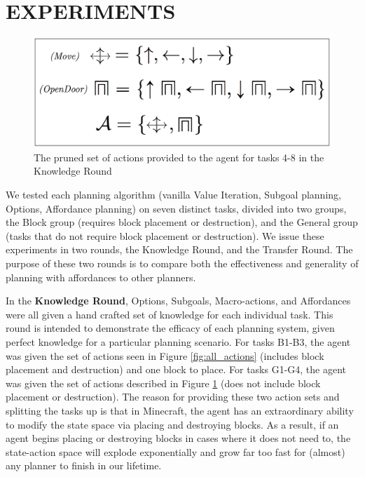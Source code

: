 \documentclass[]{article}
\begin{document}
\section{EXPERIMENTS}

\begin{figure}
\centering
\includegraphics[scale=0.2]{figures/reg_actions.png}
\caption{The pruned set of actions provided to the agent for tasks 4-8 in the Knowledge Round \label{fig:reg_actions}}
\end{figure}

We tested each planning algorithm (vanilla Value Iteration, Subgoal planning, Options, Affordance planning) on seven distinct tasks, divided into two groups, the Block group (requires block placement or destruction), and the General group (tasks that do not require block placement or destruction). We issue these experiments in two rounds, the Knowledge Round, and the Transfer Round. The purpose of these two rounds is to compare both the effectiveness and generality of planning with affordances to other planners.



In the {\bf Knowledge Round}, Options, Subgoals, Macro-actions, and Affordances were all given a hand crafted set of knowledge for each individual task. This round is intended to demonstrate the efficacy of each planning system, given perfect knowledge for a particular planning scenario. For tasks B1-B3, the agent was given the set of actions seen in Figure \ref{fig:all_actions} (includes block placement and destruction) and one block to place. For tasks G1-G4, the agent was given the set of actions described in Figure \ref{fig:reg_actions} (does not include block placement or destruction). The reason for providing these two action sets and splitting the tasks up is that in Minecraft, the agent has an extraordinary ability to modify the state space via placing and destroying blocks. As a result, if an agent begins placing or destroying blocks in cases where it does not need to, the state-action space will explode exponentially and grow far too fast for (almost) any planner to finish in our lifetime. 
\end{document}
